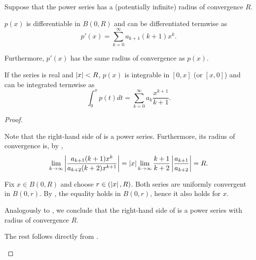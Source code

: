 \begin{theorem}\label{thm:series_termwise_operations}
  Suppose that the power series  has a (potentially infinite) radius of convergence \( R \).

  \begin{defenum}
     \( p(x) \) is differentiable in \( B(0, R) \) and can be differentiated termwise as
    \begin{equation}\label{thm:series_termwise_operations/derivative}
      p'(x) = \sum_{k=0}^\infty a_{k+1} (k+1) x^k.
    \end{equation}

    Furthermore, \( p'(x) \) has the same radius of convergence as \( p(x) \).

     If the series is real and \( \left\vert x \right\vert < R \), \( p(x) \) is integrable in \( [0, x] \) (or \( [x, 0] \)) and can be integrated termwise as
    \begin{equation}\label{thm:series_termwise_operations/primitive}
      \int_0^x p(t) dt = \sum_{k=0}^\infty a_k \frac {x^{k+1}} {k+1}.
    \end{equation}
  \end{defenum}
\end{theorem}
\begin{proof}\mbox{}
  \begin{description}
     Note that the right-hand side of  is a power series. Furthermore, its radius of convergence is, by ,
    \begin{equation*}
      \lim_{k \to \infty} \left\vert \frac {a_{k+1} (k+1) x^k} {a_{k+2} (k+2) x^{k+1}} \right\vert
      =
      \left\vert x \right\vert \lim_{k \to \infty} \frac {k+1} {k+2} \left\vert \frac {a_{k+1}} {a_{k+2}} \right\vert
      =
      R.
    \end{equation*}

    Fix \( x \in B(0, R) \) and choose \( r \in (\left\vert x \right\vert, R) \). Both series are uniformly convergent in \( B(0, r) \). By , the equality  holds in \( B(0, r) \), hence it also holds for \( x \).

     Analogously to , we conclude that the right-hand side of  is a power series with radius of convergence \( R \).

    The rest follows directly from .
  \end{description}
\end{proof}

